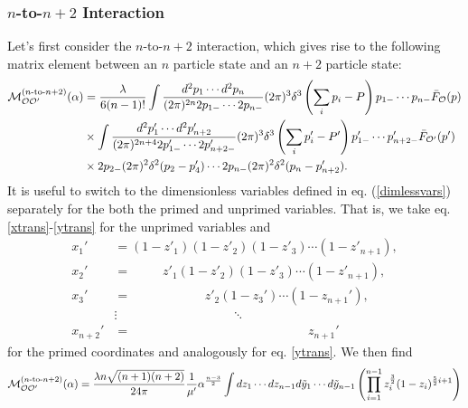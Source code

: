 \begin{subappendices}
\subsubsection{$n$-to-$n+2$ Interaction} Let's first consider the $n$-to-$n+2$ interaction, which gives rise to the following matrix element between an $n$ particle state and an $n+2$ particle state: \begin{equation}
	\begin{aligned}
		{\cal M}^{(n\textrm{-to-}n+2)}_{{\cal O} {\cal O}'}(\alpha) &= \frac{\lambda}{6(n-1)!} \int \frac{d^2 p_1 \dotsb d^2 p_n}{(2\pi)^{2n} 2p_{1-} \dotsb 2p_{n-}} (2\pi)^3 \delta^3 \left(\sum_i p_i - P \right) p_{1-} \dotsb p_{n-} \bar{F}_{{\cal O}}(p) \\
		&\times \int \frac{d^2p_1' \dotsb d^2p_{n+2}'}{(2\pi)^{2n+4} 2p_{1-}' \dotsb 2p'_{n+2-}} (2\pi)^3 \delta^3\left(\sum_i p'_i - P' \right) p'_{1-} \dotsb p'_{n+2-} \bar{F}_{{\cal O}'}(p') \\
		&\times 2p_{2-} (2\pi)^2 \delta^2(p_2 - p'_4) \dotsb 2 p_{n-} (2\pi)^2 \delta^2 (p_n - p'_{n+2}).
	\end{aligned}
\end{equation} It is useful to switch to the dimensionless variables defined in eq. (\ref{dimlessvars}) separately for the both the primed and unprimed variables. That is, we take eq. \eqref{xtrans}-\eqref{ytrans} for the unprimed variables and \begin{equation}
		\begin{aligned}
			x_1' &= (1-z'_1)(1-z'_2)(1-z'_3) \dotsb (1-z'_{n+1}), \\
			x_2' &= \quad\quad\,\,\, z'_1(1-z'_2)(1-z'_3) \dotsb (1-z'_{n+1}), \\
			x_3' &= \quad\quad\,\,\, \quad\quad\quad\,\, z'_2(1-z_3') \dotsb (1-z_{n+1}'), \\
			&\vdots \quad\quad\quad\quad\quad\quad\quad\quad\quad \ddots \\
			x_{n+2}' &= \quad\quad\quad\quad\quad\quad\quad\quad\quad\quad\quad\quad\quad\quad z_{n+1}' \label{xtransprimed}
		\end{aligned}
	\end{equation} for the primed coordinates and analogously for eq. \eqref{ytrans}. We then find \begin{equation}
		\begin{aligned}
			&\Mcal^{(n\textrm{-to-}n+2)}_{\Ocal \Ocal'}(\alpha) = \frac{\lambda n \sqrt{(n+1)(n+2)}}{24 \pi} \frac{1}{\mu'} \alpha^{\frac{n-3}{2}} \int dz_1 \dotsb dz_{n-1}   d\tilde{y}_1 \dotsb d\tilde{y}_{n-1}  \left( \prod_{i=1}^{n-1} z_i^{\frac{3}{2}} (1-z_i)^{\frac{5}{2}i+1} \right)  \\

\end{aligned}
\end{equation}
\end{subappendices}
